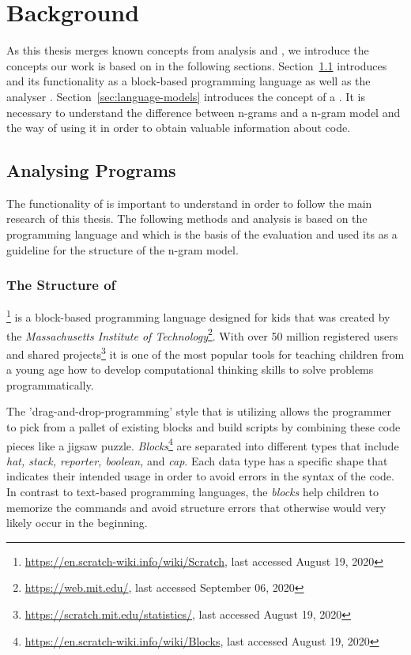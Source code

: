 \chapter{Background}\label{chap:background}

As this thesis merges known concepts from \scratch{} analysis and \ngram{}, we introduce the concepts our work is based on in the following sections. Section~\ref{sec:analysing-scratch} introduces \scratch{} and its functionality as a block-based programming language as well as the \scratch{} analyser \litterbox{}. Section~\ref{sec:language-models} introduces the concept of a \ngram{}. It is necessary to understand the difference between n-grams and a n-gram model and the way of using it in order to obtain valuable information about \scratch{} code.


\section{Analysing \scratch{} Programs}\label{sec:analysing-scratch}
The functionality of \scratch{} is important to understand in order to follow the main research of this thesis. The following methods and analysis is based on the programming language \scratch{} and \litterbox{} which is the basis of the evaluation and used its \AST{} as a guideline for the structure of the n-gram model. 

\subsection{The Structure of \scratch{}}\label{subsec:scratch}
\scratch{}\footnote{\url{https://en.scratch-wiki.info/wiki/Scratch}, last accessed August 19, 2020} is a block-based programming language designed for kids that was created by the \textit{Massachusetts Institute of Technology}\footnote{\url{https://web.mit.edu/}, last accessed September 06, 2020}. With over 50 million registered users and shared projects\footnote{\url{https://scratch.mit.edu/statistics/}, last accessed August 19, 2020} it is one of the most popular tools for teaching children from a young age how to develop computational thinking skills to solve problems programmatically.

The 'drag-and-drop-programming' style that \scratch{} is utilizing allows the programmer to pick from a pallet of existing blocks and build scripts by combining these code pieces like a jigsaw puzzle.
\textit{Blocks}\footnote{\url{https://en.scratch-wiki.info/wiki/Blocks}, last accessed August 19, 2020} are separated into different types that include \textit{hat, stack, reporter, boolean,} and \textit{cap}. Each data type has a specific shape that indicates their intended usage in order to avoid errors in the syntax of the code. In contrast to text-based programming languages, the \textit{blocks} help children to memorize the commands and avoid structure errors that otherwise would very likely occur in the beginning. 

